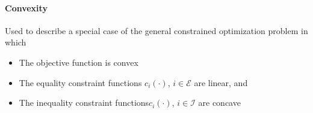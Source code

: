 
\paragraph{Convexity} Used to describe a special case of the general constrained optimization problem in which
\begin{itemize}[nolistsep,noitemsep]
    \item The objective function is convex
    \item The equality constraint functions $c_i(\cdot)$, $i \in \mathcal{E}$ are linear, and
    \item The inequality constraint functions$c_i(\cdot)$, $i \in \mathcal{I}$ are concave
\end{itemize}
